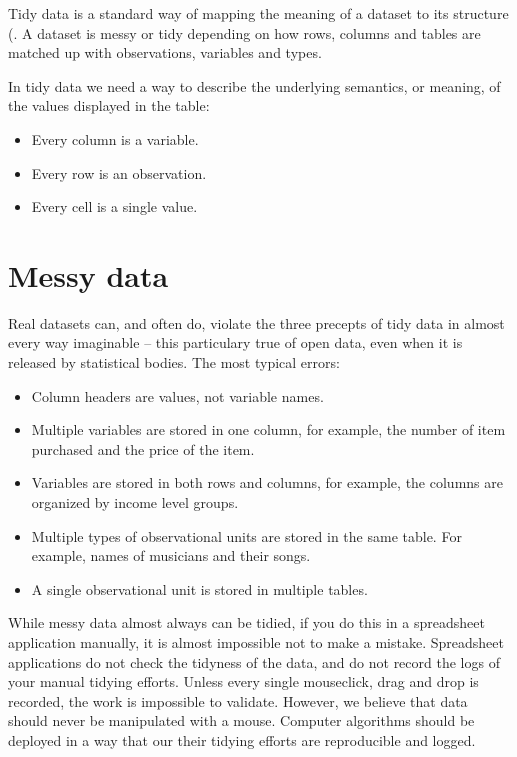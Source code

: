 \documentclass[
  a4paper,
  openany, a4paper, oneside]{book}
\providecommand{\tightlist}{%
  \setlength{\itemsep}{0pt}\setlength{\parskip}{0pt}}
\begin{document}
Tidy data is a standard way of mapping the meaning of a dataset to its structure (. A dataset is messy or tidy depending on how rows, columns and tables are matched up with observations, variables and types.

In tidy data we need a way to describe the underlying semantics, or meaning, of the values displayed in the table:

\begin{itemize}
\tightlist
\item
  Every column is a variable.
\item
  Every row is an observation.
\item
  Every cell is a single value.
\end{itemize}

\hypertarget{messy-data}{%
\section{Messy data}\label{messy-data}}

Real datasets can, and often do, violate the three precepts of tidy data in almost every way imaginable -- this particulary true of open data, even when it is released by statistical bodies. The most typical errors:

\begin{itemize}
\tightlist
\item
  Column headers are values, not variable names.
\item
  Multiple variables are stored in one column, for example, the number of item purchased and the price of the item.
\item
  Variables are stored in both rows and columns, for example, the columns are organized by income level groups.
\item
  Multiple types of observational units are stored in the same table. For example, names of musicians and their songs.
\item
  A single observational unit is stored in multiple tables.
\end{itemize}

While messy data almost always can be tidied, if you do this in a spreadsheet application manually, it is almost impossible not to make a mistake. Spreadsheet applications do not check the tidyness of the data, and do not record the logs of your manual tidying efforts. Unless every single mouseclick, drag and drop is recorded, the work is impossible to validate. However, we believe that data should never be manipulated with a mouse. Computer algorithms should be deployed in a way that our their tidying efforts are reproducible and logged.
\end{document}
